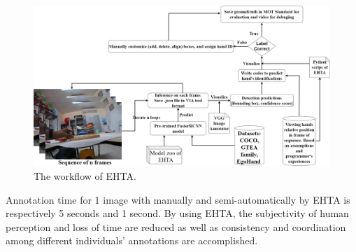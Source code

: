 \begin{figure}
	\centerline{\includegraphics[width=1\linewidth]{Figs/EHTAflowchartPage2.png}}
	\caption{The workflow of EHTA.}
	\label{fig:EHTA}
\end{figure}
Annotation time for 1 image with manually and semi-automatically by EHTA is respectively 5 seconds and 1 second. By using EHTA, the subjectivity of human perception and loss of time are reduced as well as consistency and coordination among different individuals' annotations are accomplished.